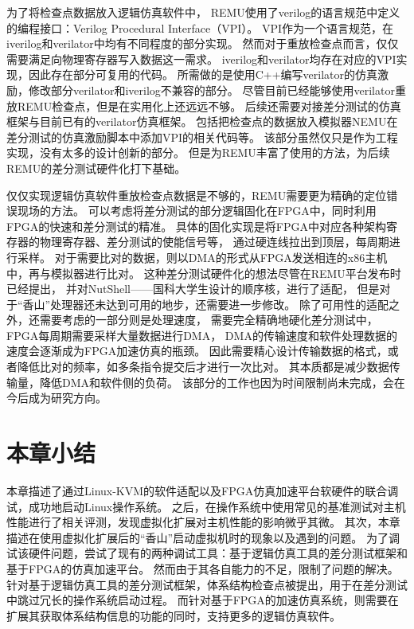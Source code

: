 为了将检查点数据放入逻辑仿真软件中，
REMU使用了verilog的语言规范中定义的编程接口：Verilog Procedural Interface（VPI）。
VPI作为一个语言规范，在iverilog和verilator中均有不同程度的部分实现。
然而对于重放检查点而言，仅仅需要满足向物理寄存器写入数据这一需求。
iverilog和verilator均存在对应的VPI实现，因此存在部分可复用的代码。
所需做的是使用C++编写verilator的仿真激励，修改部分verilator和iverilog不兼容的部分。
尽管目前已经能够使用verilator重放REMU检查点，但是在实用化上还远远不够。
后续还需要对接差分测试的仿真框架与目前已有的verilator仿真框架。
包括把检查点的数据放入模拟器NEMU在差分测试的仿真激励脚本中添加VPI的相关代码等。
该部分虽然仅只是作为工程实现，没有太多的设计创新的部分。
但是为REMU丰富了使用的方法，为后续REMU的差分测试硬件化打下基础。

仅仅实现逻辑仿真软件重放检查点数据是不够的，REMU需要更为精确的定位错误现场的方法。
可以考虑将差分测试的部分逻辑固化在FPGA中，同时利用FPGA的快速和差分测试的精准。
具体的固化实现是将FPGA中对应各种架构寄存器的物理寄存器、差分测试的使能信号等，
通过硬连线拉出到顶层，每周期进行采样。
对于需要比对的数据，则以DMA的形式从FPGA发送相连的x86主机中，再与模拟器进行比对。
这种差分测试硬件化的想法尽管在REMU平台发布时已经提出，
并对NutShell——国科大学生设计的顺序核，进行了适配，
但是对于“香山”处理器还未达到可用的地步，还需要进一步修改。
除了可用性的适配之外，还需要考虑的一部分则是处理速度，
需要完全精确地硬化差分测试中，FPGA每周期需要采样大量数据进行DMA，
DMA的传输速度和软件处理数据的速度会逐渐成为FPGA加速仿真的瓶颈。
因此需要精心设计传输数据的格式，或者降低比对的频率，如多条指令提交后才进行一次比对。
其本质都是减少数据传输量，降低DMA和软件侧的负荷。
该部分的工作也因为时间限制尚未完成，会在今后成为研究方向。

\section{本章小结}
本章描述了通过Linux-KVM的软件适配以及FPGA仿真加速平台软硬件的联合调试，成功地启动Linux操作系统。
之后，在操作系统中使用常见的基准测试对主机性能进行了相关评测，发现虚拟化扩展对主机性能的影响微乎其微。
其次，本章描述在使用虚拟化扩展后的“香山”启动虚拟机时的现象以及遇到的问题。
为了调试该硬件问题，尝试了现有的两种调试工具：基于逻辑仿真工具的差分测试框架和基于FPGA的仿真加速平台。
然而由于其各自能力的不足，限制了问题的解决。
针对基于逻辑仿真工具的差分测试框架，体系结构检查点被提出，用于在差分测试中跳过冗长的操作系统启动过程。
而针对基于FPGA的加速仿真系统，则需要在扩展其获取体系结构信息的功能的同时，支持更多的逻辑仿真软件。
